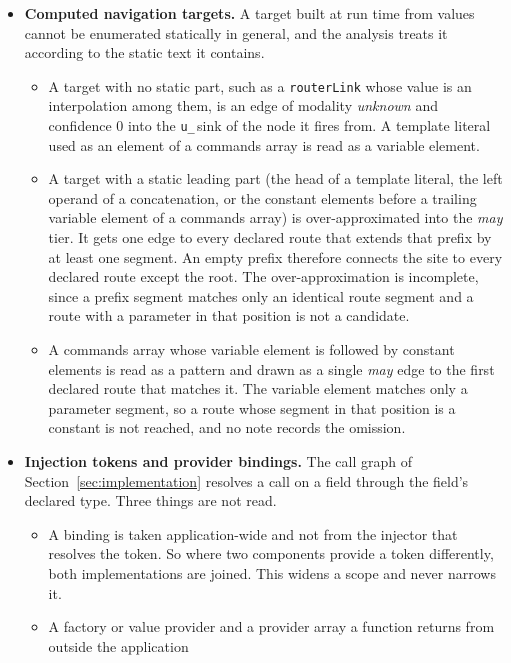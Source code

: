 \begin{itemize}[nosep]
else calls is attributed to the scope of its class and held at \emph{may}, because it runs only when
that function is called (Section~\ref{sec:res-round2}).
A fully dynamic target goes to the \texttt{u\_}\,sink. The graph records that the screen can be left for that destination, not under what condition.
\item \textbf{Computed navigation targets.} A target built at run time from values cannot be enumerated
statically in general, and the analysis treats it according to the static text it contains.
\begin{itemize}[nosep]
\item A target with no static part, such as a \texttt{routerLink} whose value is an interpolation among
them, is an edge of modality \emph{unknown} and confidence 0 into the \texttt{u\_}\,sink of the node it
fires from. A template literal used as an element of a commands array is read as a variable element.
\item A target with a static leading part (the head of a template literal, the left operand of a
concatenation, or the constant elements before a trailing variable element of a commands array) is
over-approximated into the \emph{may} tier.
It gets one edge to every declared route that extends that prefix by at least one segment. An empty prefix therefore connects the site to every declared route
except the root. The over-approximation is incomplete, since a prefix segment matches only an identical
route segment and a route with a parameter in that position is not a candidate.
\item A commands array whose variable element is followed by constant elements is read as a pattern and drawn as a single \emph{may} edge to the first declared route that matches it. The variable element matches only a parameter segment, so a route whose segment in that position is a constant is not reached, and no note records the omission.
\end{itemize}
\item \textbf{Injection tokens and provider bindings.} The call graph of Section~\ref{sec:implementation} resolves a call on a field through the field's declared type. Three things are not read.
\begin{itemize}[nosep]
\item A binding is taken application-wide and not from the injector that resolves the token.
So where two components provide a token differently, both implementations are joined.
This widens a scope and never narrows it.
\item A factory or value provider and a provider array a function returns from outside the application

\end{itemize}
\end{itemize}
